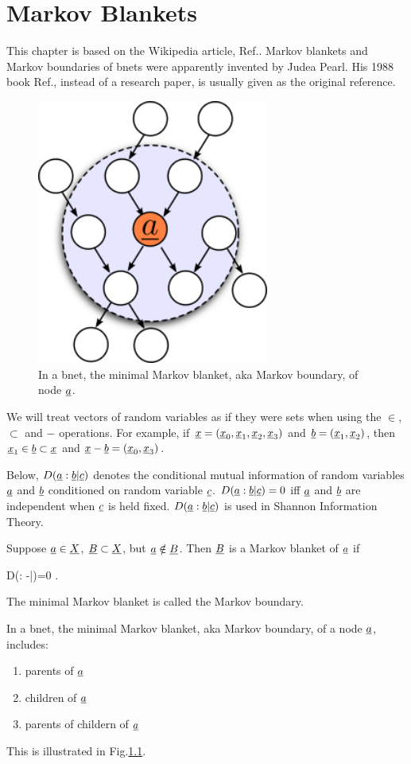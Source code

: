 \chapter{Markov Blankets}


This chapter is based on the
Wikipedia article, 
Ref.\cite{wiki-mblanket}.
Markov blankets
and Markov boundaries of bnets
were apparently invented
by Judea Pearl. His 1988 book
 Ref.\cite{Pearl-mblanket}, 
instead of a research paper, is 
usually given as the original reference.

\begin{figure}[h!]
\centering
\includegraphics[width=3in]{mblanket/mblanket.png}
\caption{In a bnet,
the minimal Markov blanket,
aka Markov boundary,
of node ${\underline{a}}$.} 
\label{fig-mblanket}
\end{figure}

We will treat vectors 
of random variables as if
they were sets when using the $\in$,
$\subset$ and $-$ operations.
For example,
if ${\underline{x}}=({\underline{x}}_0, 
{\underline{x}}_1, {\underline{x}}_2,
{\underline{x}}_3)$ and
${\underline{b}}=({\underline{x}}_1, {\underline{x}}_2)$,
then ${\underline{x}}_1\in {\underline{b}}\subset {\underline{x}}$ and
${\underline{x}}-{\underline{b}}=({\underline{x}}_0, {\underline{x}}_3)$.

Below, $D({\underline{a}}:{\underline{b}}|{\underline{c}})$
denotes the conditional
mutual information of
random variables
${\underline{a}}$ and ${\underline{b}}$
conditioned on 
random variable ${\underline{c}}$.
$D({\underline{a}}:{\underline{b}}|{\underline{c}})=0$
iff ${\underline{a}}$ and ${\underline{b}}$
are independent
when ${\underline{c}}$ is held fixed.
$D({\underline{a}}:{\underline{b}}|{\underline{c}})$
is used in Shannon Information
Theory.


Suppose
${\underline{a}}\in  {\underline{X}}$,
 ${\underline{B}}\subset {\underline{X}}$,
but ${\underline{a}}\notin{\underline{B}}$.
Then ${\underline{B}}$ is a Markov blanket
of ${\underline{a}}$ if

\beq
D(\rva: \rvX-\rva|\rvB)=0
\;.
\eeq

The minimal Markov blanket 
is called the Markov boundary.

In a bnet, the minimal Markov blanket,
aka Markov boundary,
of a node ${\underline{a}}$,
includes:
\begin{enumerate}
\item
parents of ${\underline{a}}$
\item
children of ${\underline{a}}$
\item
parents of childern of ${\underline{a}}$
\end{enumerate}
This is illustrated in 
Fig.\ref{fig-mblanket}.
